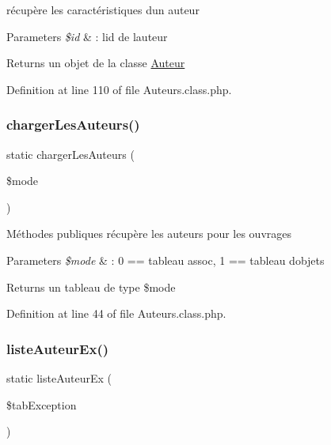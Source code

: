 récupère les caractéristiques d\textquotesingle{}un auteur 
\begin{DoxyParams}{Parameters}
{\em \$id} & \+: l\textquotesingle{}id de l\textquotesingle{}auteur \\
\hline
\end{DoxyParams}
\begin{DoxyReturn}{Returns}
un objet de la classe \hyperlink{class_auteur}{Auteur} 
\end{DoxyReturn}


Definition at line 110 of file Auteurs.\+class.\+php.

\mbox{\label{class_auteurs_ab4cdf0e170009a70a0b8c17b03a76ee9}} 
\subsubsection{\texorpdfstring{charger\+Les\+Auteurs()}{chargerLesAuteurs()}}
{\footnotesize\ttfamily static charger\+Les\+Auteurs (\begin{DoxyParamCaption}\item[{}]{\$mode }\end{DoxyParamCaption})\hspace{0.3cm}{\ttfamily [static]}}

Méthodes publiques récupère les auteurs pour les ouvrages 
\begin{DoxyParams}{Parameters}
{\em \$mode} & \+: 0 == tableau assoc, 1 == tableau d\textquotesingle{}objets \\
\hline
\end{DoxyParams}
\begin{DoxyReturn}{Returns}
un tableau de type \$mode 
\end{DoxyReturn}


Definition at line 44 of file Auteurs.\+class.\+php.

\mbox{\label{class_auteurs_acaeff693a5c5d72b45bdce511687fc97}} 
\subsubsection{\texorpdfstring{liste\+Auteur\+Ex()}{listeAuteurEx()}}
{\footnotesize\ttfamily static liste\+Auteur\+Ex (\begin{DoxyParamCaption}\item[{}]{\$tab\+Exception }\end{DoxyParamCaption})\hspace{0.3cm}{\ttfamily [static]}}



